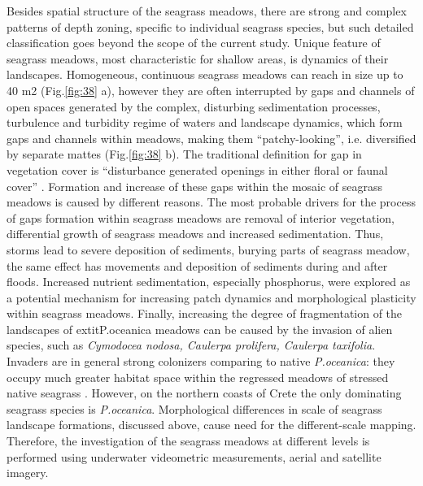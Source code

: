 \documentclass[11pt]{article}
\begin{document}
Besides spatial structure of the seagrass meadows, there are strong and complex patterns of depth zoning, specific to individual
seagrass species, but such detailed classification goes beyond the scope of the current study.
Unique feature of seagrass meadows, most characteristic for shallow areas, is dynamics of their
landscapes. Homogeneous, continuous seagrass meadows can reach in size up to 40 m2 (Fig.\ref{fig:38} a),
however they are often interrupted by gaps and channels of open spaces generated by the complex,
disturbing sedimentation processes, turbulence and turbidity regime of waters and landscape dynamics,
which form gaps and channels within meadows, making them “patchy-looking”, i.e. diversified by
separate mattes (Fig.\ref{fig:38} b). The traditional definition for gap in vegetation cover is “disturbance generated
openings in either floral or faunal cover” \cite{Connell78}\label{Connell78}.
Formation and increase of these
gaps within the mosaic of seagrass meadows is caused by different reasons. The most probable
drivers for the process of gaps formation within seagrass meadows are removal of interior vegetation,
differential growth of seagrass meadows and increased sedimentation. Thus, storms lead to severe
deposition of sediments, burying parts of seagrass meadow, the same effect has movements and
deposition of sediments during and after floods\cite{Bell99}\label{Bell99}.
Increased nutrient sedimentation, especially phosphorus, were explored \cite{Jensen01}\label{Jensen01} as a
potential mechanism for increasing patch dynamics and morphological plasticity within seagrass
meadows. Finally, increasing the degree of fragmentation of the landscapes of 	extit{P.oceanica} meadows
can be caused by the invasion of alien species, such as \textit{Cymodocea nodosa, Caulerpa prolifera,
Caulerpa taxifolia}. Invaders are in general strong colonizers comparing to native \textit{P.oceanica}: they
occupy much greater habitat space within the regressed meadows of stressed native seagrass
\cite{Montefalcone10}\label{Montefalcone10}. However, on the northern coasts of Crete the only dominating seagrass
species is \textit{P.oceanica}.
Morphological differences in scale of seagrass landscape formations, discussed above, cause need for
the different-scale mapping. Therefore, the investigation of the seagrass meadows at different levels is
performed using underwater videometric measurements, aerial and satellite imagery.
\pagebreak
\end{document}
